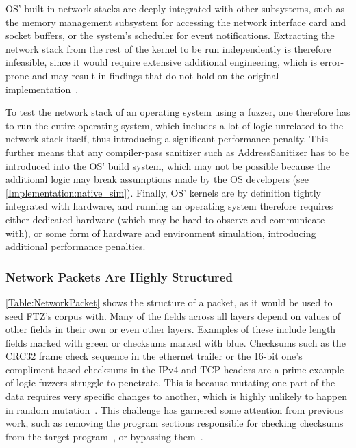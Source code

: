 \documentclass[twocolumn]{article}
\newcommand{\proj}{FTZ\xspace}
\let\savedCite=\cite
\renewcommand{\cite}{\unskip~\savedCite}
\begin{document}
OS' built-in network stacks are deeply integrated with other subsystems, such as the memory management subsystem for accessing the network interface card and socket buffers, or the system's scheduler for event notifications. Extracting the network stack from the rest of the kernel to be run independently is therefore infeasible, since it would require extensive additional engineering, which is error-prone and may result in findings that do not hold on the original implementation\cite{KernelVsUserNetworking}.

To test the network stack of an operating system using a fuzzer, one therefore has to run the entire operating system, which includes a lot of logic unrelated to the network stack itself, thus introducing a significant performance penalty. This further means that any compiler-pass sanitizer such as AddressSanitizer has to be introduced into the OS' build system, which may not be possible because the additional logic may break assumptions made by the OS developers (see \cref{Implementation:native_sim}). Finally, OS' kernels are by definition tightly integrated with hardware, and running an operating system therefore requires either dedicated hardware (which may be hard to observe and communicate with), or some form of hardware and environment simulation, introducing additional performance penalties.

\subsubsection{Network Packets Are Highly Structured}
\label{Background:TcpIsStructured}

\cref{Table:NetworkPacket} shows the structure of a packet, as it would be used to seed \proj's corpus with. Many of the fields across all layers depend on values of other fields in their own or even other layers. Examples of these include length fields marked with green or checksums marked with blue. Checksums such as the CRC32 frame check sequence in the ethernet trailer or the 16-bit one's compliment-based checksums in the IPv4 and TCP headers are a prime example of logic fuzzers struggle to penetrate. This is because mutating one part of the data requires very specific changes to another, which is highly unlikely to happen in random mutation\cite{StateOfTheArt}. This challenge has garnered some attention from previous work, such as removing the program sections responsible for checking checksums from the target program\cite{TFuzz}, or bypassing them\cite{REDQUEEN}.
\end{document}

